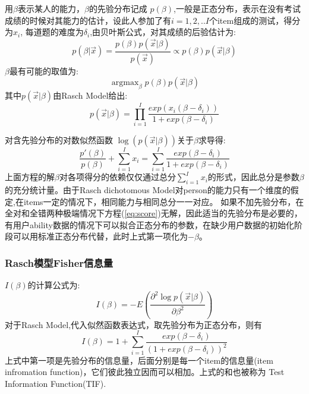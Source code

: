 \documentclass[xetex,mathserif,serif]{beamer}
\DeclareMathOperator*{\argmax}{argmax}
\begin{document}
  \appendix
   \begin{frame}
    \label{A3}
    用$\beta$表示某人的能力，$\beta$的先验分布记成
$p(\beta)$,一般是正态分布，表示在没有考试成绩的时候对其能力的估计，设此人参加了有$i=1,2,..I$个item组成的测试，得分为$x_i$,
每道题的难度为$\delta_i$,由贝叶斯公式，对其成绩的后验估计为:
\pause\begin{equation}
p(\beta|\vec{x})=\frac{p(\beta)p(\vec{x}|\beta)}{p(\vec{x})}\propto p(\beta)p(\vec{x}|\beta)
\end{equation}
$\beta$最有可能的取值为:
\pause\begin{equation}\label{eq:map}
\argmax_{\beta} p(\beta)p(\vec{x}|\beta)
\end{equation}
其中$p(\vec{x}|\beta)$由Rasch Model给出:
\pause\begin{equation}
p(\vec{x}|\beta)=\prod_{i=1}^I \frac{exp(x_i(\beta-\delta_i))}{1+exp(\beta-\delta_i)}
\end{equation}
  \end{frame}
   \begin{frame}
    
对含先验分布的对数似然函数
$\log(p(\vec{x}|\beta))$关于$\beta$求导得:
\pause\begin{equation}\label{eq:score}
\frac{p'(\beta)}{p(\beta)}+\sum_{i=1}^I x_i =\sum_{i=1}^I \frac{exp(\beta-\delta_i)}{1+exp(\beta-\delta_i)}
\end{equation}
上面方程的解$\beta$对各项得分的依赖仅仅通过总分$\sum_{i=1}^I x_i$的形式，因此总分是参数$\beta$的充分统计量。由于Rasch  dichotomous Model对person的能力只有一个维度的假定,在items一定的情况下，相同能力与相同总分一一对应。
如果不加先验分布，在全对和全错两种极端情况下方程(\ref{eq:score})无解，因此适当的先验分布是必要的，有用户ability数据的情况下可以拟合正态分布的参数，在缺少用户数据的初始化阶段可以用标准正态分布代替，此时上式第一项化为$-\beta$。

  \end{frame}
   \begin{frame}\label{A4}
    
    \frametitle{Rasch模型Fisher信息量}
    $I(\beta)$的计算公式为:
\begin{equation}
I(\beta)=-E(\frac{\partial^2 \log p(\vec{x}|\beta)}{\partial \beta^2})
\end{equation}
对于Rasch Model,代入似然函数表达式，取先验分布为正态分布，则有
\begin{equation}
I(\beta)=1+\sum_{i=1}^I \frac{exp(\beta-\delta_i)}{(1+exp(\beta-\delta_i))^2}
\end{equation}
上式中第一项是先验分布的信息量，后面分别是每一个item的信息量(item infromation function)，它们彼此独立因而可以相加。上式的和也被称为
Test Information Function(TIF).

  \end{frame}
\end{document}

